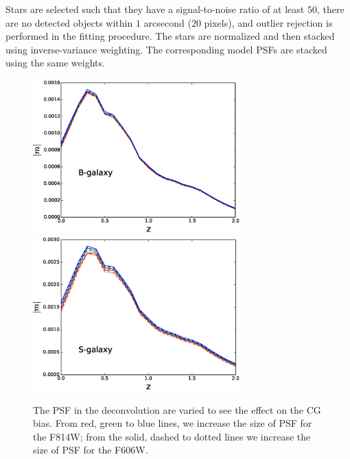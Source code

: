 \documentclass[useAMS,usenatbib]{mn2e}
\begin{document}
Stars are selected such that they have a signal-to-noise ratio of at
least $50$, there are no detected objects within $1$ arcsecond ($20$
pixels), and outlier rejection is performed in the fitting procedure.
The stars are normalized and then stacked using inverse-variance
weighting. The corresponding model PSFs are stacked using the same
weights.

%
\begin{figure}
\includegraphics[width=8.0cm]{varpsfB.eps}
\includegraphics[width=8.0cm]{varpsfS.eps}
\caption{The PSF in the deconvolution are varied to see the effect on
  the CG bias.  From red, green to blue lines, we increase the size of
  PSF for the F814W; from the solid, dashed to dotted lines we
  increase the size of PSF for the F606W.  }
\label{fig:psfacc1}
\end{figure}
%
\end{document}
